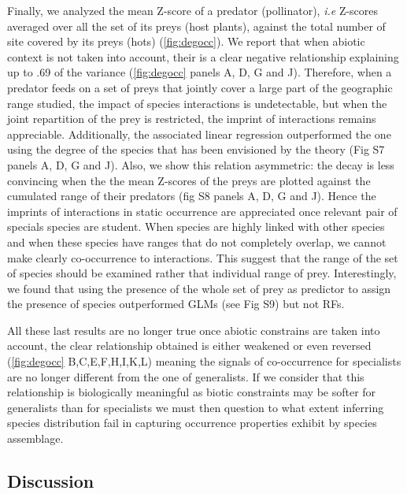 Finally, we analyzed the mean Z-score of a predator (pollinator),
\emph{i.e} Z-scores averaged over all the set of its preys (host
plants), against the total number of site covered by its preys (hots)
(\ref{fig:degocc}). We report that when abiotic context is not taken
into account, their is a clear negative relationship explaining up to
.69 of the variance (\ref{fig:degocc} panels A, D, G and J). Therefore,
when a predator feeds on a set of preys that jointly cover a large part
of the geographic range studied, the impact of species interactions is
undetectable, but when the joint repartition of the prey is restricted,
the imprint of interactions remains appreciable. Additionally, the
associated linear regression outperformed the one using the degree of
the species that has been envisioned by the theory (Fig S7 panels A, D,
G and J). Also, we show this relation asymmetric: the decay is less
convincing when the the mean Z-scores of the preys are plotted against
the cumulated range of their predators (fig S8 panels A, D, G and J).
Hence the imprints of interactions in static occurrence are appreciated
once relevant pair of specials species are student. When species are
highly linked with other species and when these species have ranges that
do not completely overlap, we cannot make clearly co-occurrence to
interactions. This suggest that the range of the set of species should
be examined rather that individual range of prey. Interestingly, we
found that using the presence of the whole set of prey as predictor to
assign the presence of species outperformed GLMs (see Fig S9) but not
RFs.

All these last results are no longer true once abiotic constrains are
taken into account, the clear relationship obtained is either weakened
or even reversed (\ref{fig:degocc} B,C,E,F,H,I,K,L) meaning the signals
of co-occurrence for specialists are no longer different from the one of
generalists. If we consider that this relationship is biologically
meaningful as biotic constraints may be softer for generalists than for
specialists we must then question to what extent inferring species
distribution fail in capturing occurrence properties exhibit by species
assemblage.

\subsection{Discussion}\label{discussion}


